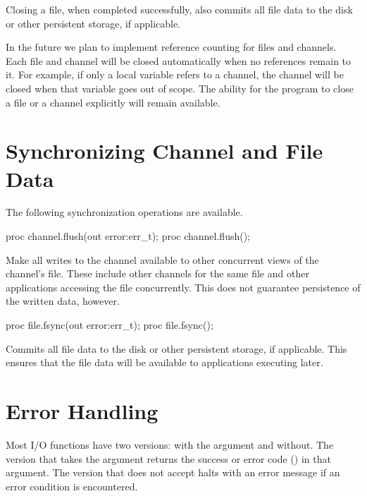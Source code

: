 Closing a file, when completed successfully, also commits
all file data to the disk or other persistent storage,
if applicable.

\begin{future}
In the future we plan to implement reference counting for files
and channels. Each file and channel will be closed automatically
when no references remain to it. For example, if only a local
variable refers to a channel, the channel will be closed
when that variable goes out of scope.
The ability for the program to close a file or a channel
explicitly will remain available.
\end{future}


\section{Synchronizing Channel and File Data}
\label{IO_synchronization}

The following synchronization operations are available.

\begin{protohead}
proc channel.flush(out error:err_t);
proc channel.flush();
\end{protohead}
\begin{protobody}
Make all writes to the channel available to other concurrent views of the
channel's file. These include other channels for the same file and
other applications accessing the file concurrently.
This does not guarantee persistence of the written data, however.
\end{protobody}

\begin{protohead}
proc file.fsync(out error:err_t);
proc file.fsync();
\end{protohead}
\begin{protobody}
Commits all file data to the disk or other persistent storage, if
applicable. This ensures that the file data will be available to
applications executing later.
\end{protobody}


\section{Error Handling}
\label{IO_error_handling}

Most I/O functions have two versions: with the 
argument and without. The version that takes the  argument
returns the success or error code () in that argument.
The version that does not accept  halts with an error message
if an error condition is encountered.

